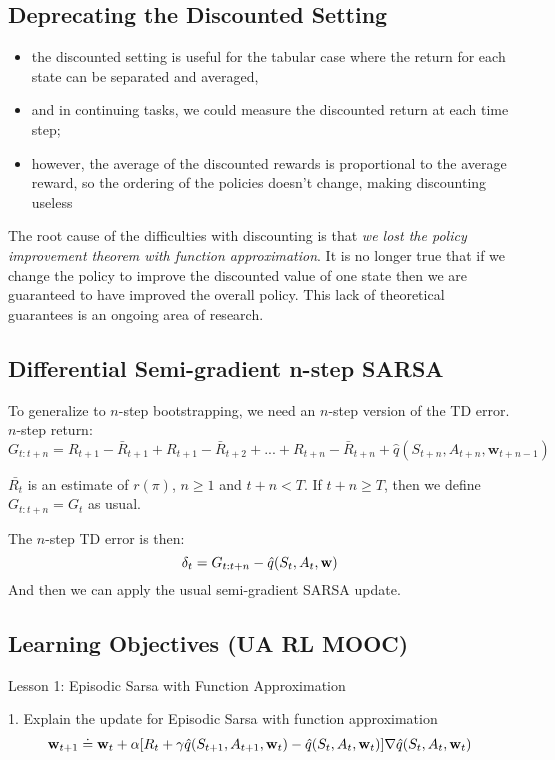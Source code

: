 \documentclass[sutton_barto_notes.tex]{subfiles}
\begin{document}
\subsection{Deprecating the Discounted Setting}

\begin{itemize}
\item the discounted setting is useful for the tabular case where the return for each state can be separated and averaged,
\item and in continuing tasks, we could measure the discounted return at each time step;
\item however, the average of the discounted rewards is proportional to the average reward, so the ordering of the policies doesn't change, making discounting useless
\end{itemize}

The root cause of the difficulties with discounting is that \textit{we lost the policy improvement theorem with function approximation}.
It is no longer true that if we change the policy to improve the discounted value of one state then we are guaranteed to have improved the overall policy. This lack of theoretical guarantees is an ongoing area of research.

\subsection{Differential Semi-gradient n-step SARSA}

To generalize to $n$-step bootstrapping, we need an $n$-step version of the TD error. $n$-step return:
$$ G_{t:t+n} = R_{t+1} - \bar{R}_{t+1} + R_{t+1} - \bar{R}_{t+2} + ... + R_{t+n} - \bar{R}_{t+n} + \hat{q}(S_{t+n}, A_{t+n}, \mathbf{w}_{t+n-1}) $$

$\bar{R_t}$ is an estimate of $r(\pi)$, $n \geq 1$ and $t + n < T$.
If $t + n \geq T$, then we define $G_{t:t+n} = G_t$ as usual.

The $n$-step TD error is then:
$$ \delta_t = G_{t:t+n} - \hat{q}(S_t, A_t, \operatorname*{\mathbf{w}}) $$
And then we can apply the usual semi-gradient SARSA update.

\subsection{Learning Objectives (UA RL MOOC)}
Lesson 1: Episodic Sarsa with Function Approximation 

1. Explain the update for Episodic Sarsa with function approximation 
$${\operatorname*{\mathbf{w}}}_{t+1} \doteq {\operatorname*{\mathbf{w}}}_t + \alpha[R_{t} + \gamma\hat{q}(S_{t+1}, A_{t+1}, {\operatorname*{\mathbf{w}}}_t) - \hat{q}(S_t, A_t, {\operatorname*{\mathbf{w}}}_t)]\nabla\hat{q}(S_t, A_t, {\operatorname*{\mathbf{w}}}_t)$$
\end{document}
